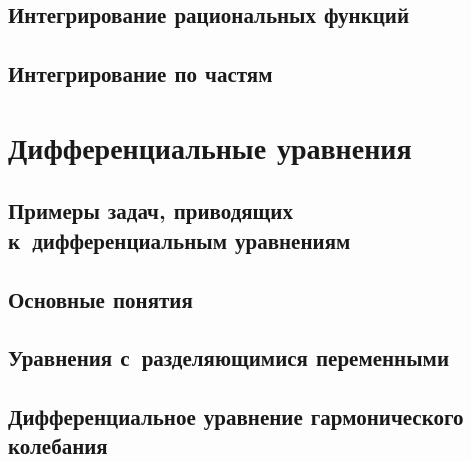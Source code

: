 \documentclass[14pt, oneside]{extbook}
\begin{document}
\section{Интегрирование рациональных функций}

\section{Интегрирование по частям}



\chapter{Дифференциальные уравнения}

\section{Примеры задач, приводящих к~дифференциальным уравнениям}

\section{Основные понятия}

\section{Уравнения с~разделяющимися переменными}

\section{Дифференциальное уравнение гармонического колебания}

\end{document}

